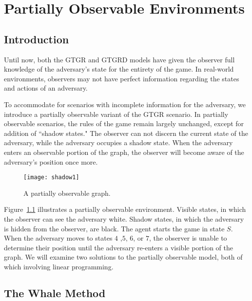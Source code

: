 %
%


\chapter{Partially Observable Environments}

\section{Introduction}
Until now, both the GTGR and GTGRD models have given the observer full knowledge of the adversary's state for the entirety of the game. In real-world environments, observers may not have perfect information regarding the states and actions of an adversary. 

To accommodate for scenarios with incomplete information for the adversary, we introduce a partially observable variant of the GTGR scenario. In partially observable scenarios, the rules of the game remain largely unchanged, except for addition of “shadow states." The observer can not discern the current state of the adversary, while the adversary occupies a shadow state. When the adversary enters an observable portion of the graph, the observer will become aware of the adversary's position once more.

\begin{figure}[h!]
\begin{center}

  \texttt{[image: shadow1]}
  \end{center}

  \caption{A partially observable graph.}
  \label{fig:shadow1}
\end{figure}

Figure~\ref{fig:shadow1} illustrates a partially observable environment. Visible states, in which the observer can see the adversary  white. Shadow states, in which the adversary is hidden from the observer, are black. The agent starts the game in state $S$. When the adversary moves to states $4$ ,$5$, $6$, or $7$, the observer is unable to determine their position until the adversary re-enters a visible portion of the graph.  
We will examine two solutions to the partially observable model, both of which involving linear programming. 

\section{The Whale Method}

